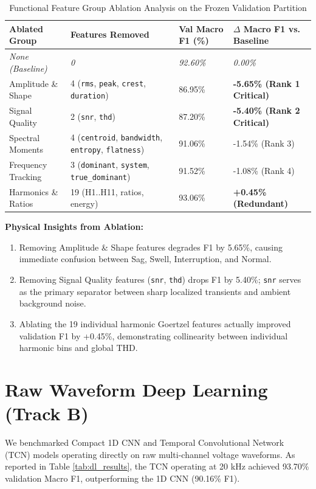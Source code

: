 \documentclass[12pt,a4paper]{report}
\begin{document}
\begin{table}[H]
\centering
\caption{Functional Feature Group Ablation Analysis on the Frozen Validation Partition}
\label{tab:ablation_results}
\begin{tabularx}{\textwidth}{lXXl}
\toprule
\textbf{Ablated Group} & \textbf{Features Removed} & \textbf{Val Macro F1 (\%)} & \textbf{$\Delta$ Macro F1 vs. Baseline} \\
\midrule
\textit{None (Baseline)} & \textit{0} & \textit{92.60\%} & \textit{0.00\%} \\
Amplitude \& Shape & 4 (\texttt{rms}, \texttt{peak}, \texttt{crest}, \texttt{duration}) & 86.95\% & \textbf{-5.65\% (Rank 1 Critical)} \\
Signal Quality & 2 (\texttt{snr}, \texttt{thd}) & 87.20\% & \textbf{-5.40\% (Rank 2 Critical)} \\
Spectral Moments & 4 (\texttt{centroid}, \texttt{bandwidth}, \texttt{entropy}, \texttt{flatness}) & 91.06\% & -1.54\% (Rank 3) \\
Frequency Tracking & 3 (\texttt{dominant}, \texttt{system}, \texttt{true\_dominant}) & 91.52\% & -1.08\% (Rank 4) \\
Harmonics \& Ratios & 19 (H1..H11, ratios, energy) & 93.06\% & \textbf{+0.45\% (Redundant)} \\
\bottomrule
\end{tabularx}
\end{table}

\noindent
\textbf{Physical Insights from Ablation:}
\begin{enumerate}
    \item Removing Amplitude \& Shape features degrades F1 by 5.65\%, causing immediate confusion between Sag, Swell, Interruption, and Normal.
    \item Removing Signal Quality features (\texttt{snr}, \texttt{thd}) drops F1 by 5.40\%; \texttt{snr} serves as the primary separator between sharp localized transients and ambient background noise.
    \item Ablating the 19 individual harmonic Goertzel features actually improved validation F1 by +0.45\%, demonstrating collinearity between individual harmonic bins and global THD.
\end{enumerate}

\section{Raw Waveform Deep Learning (Track B)}
We benchmarked Compact 1D CNN and Temporal Convolutional Network (TCN) models operating directly on raw multi-channel voltage waveforms. As reported in Table \ref{tab:dl_results}, the TCN operating at 20 kHz achieved 93.70\% validation Macro F1, outperforming the 1D CNN (90.16\% F1).
\end{document}
